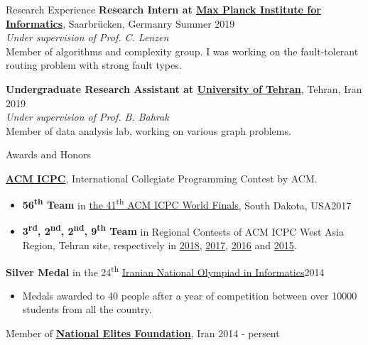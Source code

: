 \documentclass{resume} %
\begin{document}
\begin{rSection}{Research Experience}
{\bf Research Intern at \href{https://www.mpi-inf.mpg.de/}{Max Planck Institute for Informatics}}, {\small Saarbr{\"u}cken, Germanry \hfill Summer 2019}
\\\textit{Under supervision of Prof. C. Lenzen}
	\\Member of algorithms and complexity group. I was working on the fault-tolerant routing problem with strong fault types.

{\bf Undergraduate Research Assistant at \href{http://ut.ac.ir/en}{University of Tehran}}, Tehran, Iran \hfill{2019}
\\\textit{Under supervision of Prof. B. Bahrak}
	\\Member of data analysis lab, working on various graph problems.

\end{rSection}


\begin{rSection}{Awards and Honors}
	
	{\bf \href{http://icpc.baylor.edu/}{ACM ICPC}}, International Collegiate Programming Contest by ACM.
	\begin{itemize}
		\item {\bf 56\textsuperscript{th} Team} in
		\href{https://icpc.baylor.edu/community/results-2017}{the 41\textsuperscript{th} ACM ICPC World Finals},
		South Dakota, USA\hfill 2017
		
		\item {\bf 3\textsuperscript{rd}, 2\textsuperscript{nd}, 2\textsuperscript{nd}, 9\textsuperscript{th} Team} in Regional Contests of ACM ICPC West Asia Region,
		Tehran site, respectively in
		\href{http://icpc.sharif.edu/acmicpc18/scoreboard/}{2018},
		\href{http://icpc.sharif.edu/acmicpc17/scoreboard/}{2017},
		\href{http://icpc.sharif.edu/acmicpc16/scoreboard/}{2016} and
		\href{http://icpc.sharif.edu/acmicpc15/scoreboard/}{2015}.
	\end{itemize}
	
	{\bf Silver Medal} in the 24\textsuperscript{th} \href{http://inoi.ir/}{Iranian National Olympiad in Informatics}\hfill 2014
	\begin{itemize}
		\item[] Medals awarded to 40 people after a year of competition between over 10000 students from all the country.
	\end{itemize}
	
	Member of \href{https://www.bmn.ir/}{{\bf National Elites Foundation}}, Iran \hfill 2014 - persent
	
\end{rSection}
\end{document}
